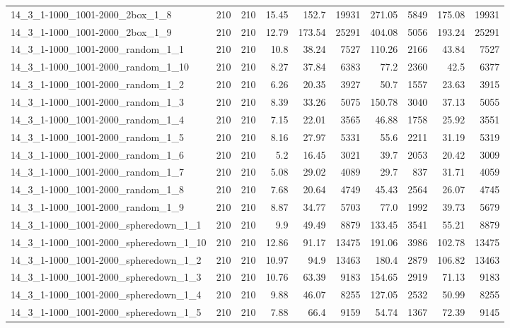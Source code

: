 \begin{center}
\begin{scriptsize}
\begin{longtable}{lrrrrrrrrr}
14\_3\_1-1000\_1001-2000\_2box\_1\_8 & 210 & 210 & 15.45 & 152.7 & 19931 & 271.05 & 5849 & 175.08 & 19931\\
14\_3\_1-1000\_1001-2000\_2box\_1\_9 & 210 & 210 & 12.79 & 173.54 & 25291 & 404.08 & 5056 & 193.24 & 25291\\
14\_3\_1-1000\_1001-2000\_random\_1\_1 & 210 & 210 & 10.8 & 38.24 & 7527 & 110.26 & 2166 & 43.84 & 7527\\
14\_3\_1-1000\_1001-2000\_random\_1\_10 & 210 & 210 & 8.27 & 37.84 & 6383 & 77.2 & 2360 & 42.5 & 6377\\
14\_3\_1-1000\_1001-2000\_random\_1\_2 & 210 & 210 & 6.26 & 20.35 & 3927 & 50.7 & 1557 & 23.63 & 3915\\
14\_3\_1-1000\_1001-2000\_random\_1\_3 & 210 & 210 & 8.39 & 33.26 & 5075 & 150.78 & 3040 & 37.13 & 5055\\
14\_3\_1-1000\_1001-2000\_random\_1\_4 & 210 & 210 & 7.15 & 22.01 & 3565 & 46.88 & 1758 & 25.92 & 3551\\
14\_3\_1-1000\_1001-2000\_random\_1\_5 & 210 & 210 & 8.16 & 27.97 & 5331 & 55.6 & 2211 & 31.19 & 5319\\
14\_3\_1-1000\_1001-2000\_random\_1\_6 & 210 & 210 & 5.2 & 16.45 & 3021 & 39.7 & 2053 & 20.42 & 3009\\
14\_3\_1-1000\_1001-2000\_random\_1\_7 & 210 & 210 & 5.08 & 29.02 & 4089 & 29.7 & 837 & 31.71 & 4059\\
14\_3\_1-1000\_1001-2000\_random\_1\_8 & 210 & 210 & 7.68 & 20.64 & 4749 & 45.43 & 2564 & 26.07 & 4745\\
14\_3\_1-1000\_1001-2000\_random\_1\_9 & 210 & 210 & 8.87 & 34.77 & 5703 & 77.0 & 1992 & 39.73 & 5679\\
14\_3\_1-1000\_1001-2000\_spheredown\_1\_1 & 210 & 210 & 9.9 & 49.49 & 8879 & 133.45 & 3541 & 55.21 & 8879\\
14\_3\_1-1000\_1001-2000\_spheredown\_1\_10 & 210 & 210 & 12.86 & 91.17 & 13475 & 191.06 & 3986 & 102.78 & 13475\\
14\_3\_1-1000\_1001-2000\_spheredown\_1\_2 & 210 & 210 & 10.97 & 94.9 & 13463 & 180.4 & 2879 & 106.82 & 13463\\
14\_3\_1-1000\_1001-2000\_spheredown\_1\_3 & 210 & 210 & 10.76 & 63.39 & 9183 & 154.65 & 2919 & 71.13 & 9183\\
14\_3\_1-1000\_1001-2000\_spheredown\_1\_4 & 210 & 210 & 9.88 & 46.07 & 8255 & 127.05 & 2532 & 50.99 & 8255\\
14\_3\_1-1000\_1001-2000\_spheredown\_1\_5 & 210 & 210 & 7.88 & 66.4 & 9159 & 54.74 & 1367 & 72.39 & 9145\\

\end{longtable}
\end{scriptsize}
\end{center}
